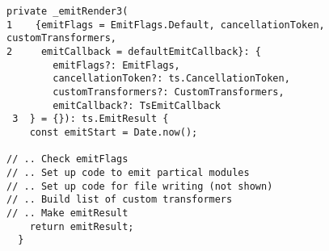 \begin{verbatim}
private _emitRender3(
1    {emitFlags = EmitFlags.Default, cancellationToken, customTransformers,
2     emitCallback = defaultEmitCallback}: {
        emitFlags?: EmitFlags,
        cancellationToken?: ts.CancellationToken,
        customTransformers?: CustomTransformers,
        emitCallback?: TsEmitCallback
 3  } = {}): ts.EmitResult {
    const emitStart = Date.now();

// .. Check emitFlags
// .. Set up code to emit partical modules
// .. Set up code for file writing (not shown)
// .. Build list of custom transformers
// .. Make emitResult
    return emitResult;
  }
\end{verbatim}
